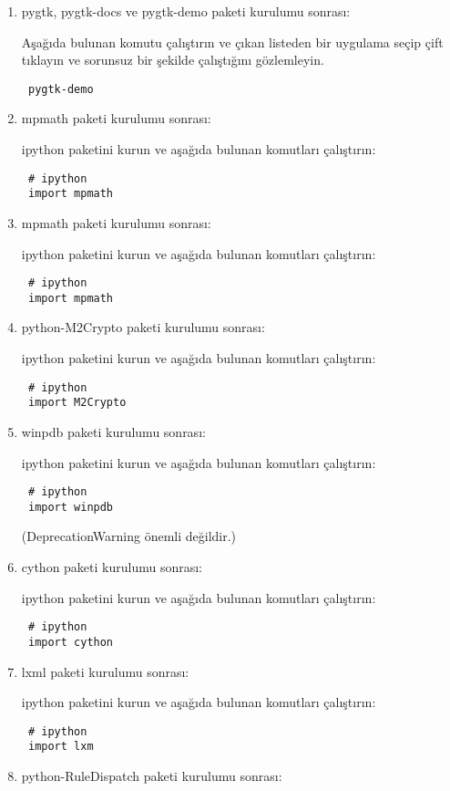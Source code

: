 \documentclass[a4paper,10pt]{article}
\begin{document}
\begin{enumerate}
\item pygtk, pygtk-docs ve pygtk-demo paketi kurulumu sonrası: 

Aşağıda bulunan komutu çalıştırın ve çıkan listeden bir uygulama seçip çift tıklayın ve sorunsuz bir şekilde çalıştığını gözlemleyin.
\begin{verbatim}
 pygtk-demo
\end{verbatim}


\item mpmath paketi kurulumu sonrası:  

ipython paketini kurun ve aşağıda bulunan komutları çalıştırın:
\begin{verbatim}
 # ipython
 import mpmath
\end{verbatim}

\item mpmath paketi kurulumu sonrası:  

ipython paketini kurun ve aşağıda bulunan komutları çalıştırın:
\begin{verbatim}
 # ipython
 import mpmath
\end{verbatim}

\item python-M2Crypto paketi kurulumu sonrası:

ipython paketini kurun ve aşağıda bulunan komutları çalıştırın:
\begin{verbatim}
 # ipython
 import M2Crypto
\end{verbatim}

\item winpdb paketi kurulumu sonrası:

ipython paketini kurun ve aşağıda bulunan komutları çalıştırın:
\begin{verbatim}
 # ipython
 import winpdb
\end{verbatim}
(DeprecationWarning önemli değildir.)

\item cython paketi kurulumu sonrası:

ipython paketini kurun ve aşağıda bulunan komutları çalıştırın:
\begin{verbatim}
 # ipython
 import cython
\end{verbatim}

\item lxml paketi kurulumu sonrası:  

ipython paketini kurun ve aşağıda bulunan komutları çalıştırın:
\begin{verbatim}
 # ipython
 import lxm
\end{verbatim}
\item python-RuleDispatch paketi kurulumu sonrası:  


\end{enumerate}
\end{document}
